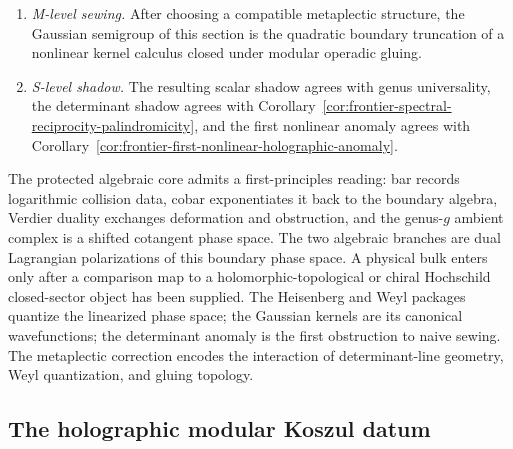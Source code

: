 \begin{conjecture}
\begin{enumerate}[label=\textup{(\roman*)}]
 $\sum_{g\ge 1}(-1)^g\kappa(\cA)\lambda_g$ on the scalar lane
 \textup{(}Hodge shadow, sign $(-1)^g$, under $H_D^K$\textup{)}, and its
 quadratic boundary image is the metaplectic trace-log anomaly series of
 Theorem~\ref{thm:frontier-metaplectic-cocycle-strictification}.
\item \emph{M-level sewing.}
 After choosing a compatible metaplectic structure, the Gaussian semigroup of
 this section is the quadratic boundary truncation of a nonlinear kernel
 calculus closed under modular operadic gluing.
\item \emph{S-level shadow.}
 The resulting scalar shadow agrees with genus universality, the determinant
 shadow agrees with
 Corollary~\ref{cor:frontier-spectral-reciprocity-palindromicity}, and the
 first nonlinear anomaly agrees with
 Corollary~\ref{cor:frontier-first-nonlinear-holographic-anomaly}.
\end{enumerate}
\end{conjecture}

\begin{remark}
\label{rem:frontier-platonic-summary}
The protected algebraic core admits a first-principles reading:
bar records logarithmic collision data, cobar exponentiates it back to
the boundary algebra, Verdier duality exchanges deformation and
obstruction, and the genus-$g$ ambient complex is a shifted cotangent
phase space. The two algebraic branches are dual Lagrangian
polarizations of this boundary phase space. A physical bulk enters only
after a comparison map to a holomorphic-topological or chiral
Hochschild closed-sector object has been supplied. The Heisenberg and Weyl packages
quantize the linearized phase space; the Gaussian kernels are its
canonical wavefunctions; the determinant anomaly is the first
obstruction to naive sewing. The metaplectic correction encodes the
interaction of determinant-line geometry, Weyl quantization, and
gluing topology.
\end{remark}


\subsection{The holographic modular Koszul datum}
\label{subsec:holographic-modular-koszul-datum}

